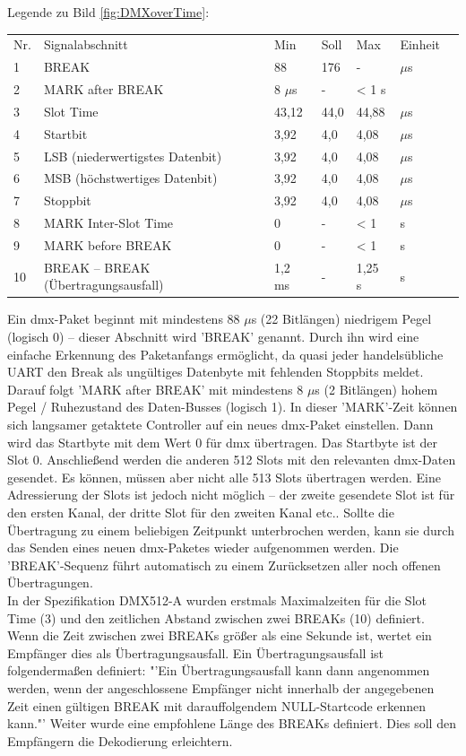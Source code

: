 \documentclass[11pt]{scrartcl}
\begin{document}
\noindent
\begin{table}[H]
    \small
    Legende zu Bild \ref{fig:DMXoverTime}:\\
    \begin{tabular*}{\textwidth}{l @{\extracolsep{\fill}} llllll}
        Nr. & Signalabschnitt & Min & Soll & Max & Einheit\\
        1 & BREAK & 88 & 176 & - & $\mu$s\\
        2 & MARK after BREAK & 8 $\mu$s & - & < 1 s\\
        3 & Slot Time & 43,12 & 44,0 & 44,88 & $\mu$s\\
        4 & Startbit & 3,92 & 4,0 & 4,08 & $\mu$s\\
        5 & LSB (niederwertigstes Datenbit) & 3,92 & 4,0 & 4,08 & $\mu$s\\
        6 & MSB (höchstwertiges Datenbit) & 3,92 & 4,0 & 4,08 & $\mu$s\\
        7 & Stoppbit & 3,92 & 4,0 & 4,08 & $\mu$s\\
        8 & MARK Inter-Slot Time & 0 & - & < 1 & s\\
        9 & MARK before BREAK & 0 & - & < 1 & s\\
        10 & BREAK – BREAK (Übertragungsausfall) & 1,2 ms & - & 1,25 s & s\\
    \end{tabular*}
\end{table}
\noindent
Ein \ac{dmx}-Paket beginnt mit mindestens 88 $\mu$s (22 Bitlängen) niedrigem Pegel (logisch 0) – dieser
Abschnitt wird 'BREAK' genannt. Durch ihn wird eine einfache Erkennung des Paketanfangs
ermöglicht, da quasi jeder handelsübliche UART den Break als ungültiges Datenbyte mit fehlenden
Stoppbits meldet. Darauf folgt 'MARK after BREAK' mit mindestens 8 $\mu$s (2 Bitlängen) hohem Pegel /
Ruhezustand des Daten-Busses (logisch 1). In dieser 'MARK'-Zeit können sich langsamer getaktete
Controller auf ein neues \ac{dmx}-Paket einstellen. Dann wird das Startbyte mit dem Wert 0 für \ac{dmx}
übertragen. Das Startbyte ist der Slot 0. Anschließend werden die anderen 512 Slots mit den
relevanten \ac{dmx}-Daten gesendet. Es können, müssen aber nicht alle 513 Slots übertragen werden.
Eine Adressierung der Slots ist jedoch nicht möglich – der zweite gesendete Slot ist für den ersten
Kanal, der dritte Slot für den zweiten Kanal etc.. Sollte die Übertragung zu einem beliebigen
Zeitpunkt unterbrochen werden, kann sie durch das Senden eines neuen \ac{dmx}-Paketes wieder
aufgenommen werden. Die 'BREAK'-Sequenz führt automatisch zu einem Zurücksetzen aller noch
offenen Übertragungen.\\
In der Spezifikation DMX512-A wurden erstmals Maximalzeiten für die Slot Time (3) und den
zeitlichen Abstand zwischen zwei BREAKs (10) definiert. Wenn die Zeit zwischen zwei BREAKs größer
als eine Sekunde ist, wertet ein Empfänger dies als Übertragungsausfall. Ein Übertragungsausfall ist
folgendermaßen definiert: "'Ein Übertragungsausfall kann dann angenommen werden, wenn der
angeschlossene Empfänger nicht innerhalb der angegebenen Zeit einen gültigen BREAK mit
darauffolgendem NULL-Startcode erkennen kann."' \cite{dmxstandard} Weiter wurde eine empfohlene Länge
des BREAKs definiert. Dies soll den Empfängern die Dekodierung erleichtern.
\clearpage
\end{document}
